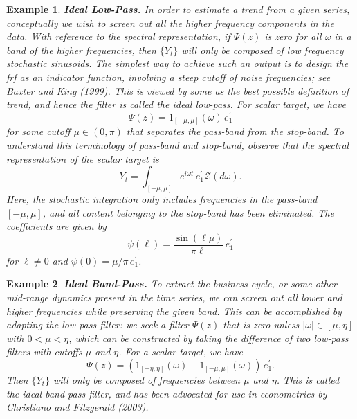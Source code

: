 \documentclass[a4paper]{book}
\newtheorem{Example}{Example}
\begin{document}
\begin{Example} {\bf Ideal Low-Pass.} \rm
\label{exam:ideal-low}
 In order to estimate a trend from a given series, conceptually we wish
 to screen out all the higher frequency components in the data.  With reference
 to the spectral representation, if $\Psi (z)$ is zero for all $\omega$ in a 
 band of the higher frequencies, then $\{ Y_t \}$ will only be composed of 
 low frequency stochastic sinusoids.  The simplest way to achieve such an output
 is to design the frf as an indicator function, involving 
  a steep cutoff of noise frequencies; see Baxter and King (1999).  This is
 viewed by some as the best possible definition of trend, and hence the filter is
 called the ideal low-pass.  For scalar target, we have
\[
  \Psi (z) = 1_{ [ -\mu, \mu ]} (\omega) \, e_1^{\prime}
\]
 for some cutoff $\mu \in (0, \pi)$ that separates the pass-band from
the stop-band.  To understand this terminology of pass-band and stop-band, observe
 that the spectral representation of the scalar target is
\[
  Y_t = \int_{ [-\mu, \mu]} e^{i \omega t} \, e_1^{\prime} 
  \mathcal{Z} (d\omega).
\]
  Here, the stochastic integration only includes frequencies in the pass-band 
 $[-\mu, \mu]$,  and all content belonging to the stop-band has been eliminated.
 The coefficients are given by 
\[ 
  \psi (\ell) = \frac{ \sin (\ell \mu) }{ \pi \ell } \, e_1^{\prime}
\]
 for $\ell \neq 0$ and $\psi (0) = \mu/\pi \, e_1^{\prime}$.   
\end{Example}

\begin{Example} {\bf Ideal Band-Pass.} \rm
\label{exam:ideal-bp}
  To extract  the business cycle, or
  some other mid-range dynamics present in the time series,
  we can screen out all lower and higher frequencies while preserving
   the given band.  This can be accomplished by adapting the
   low-pass filter: we seek a filter $\Psi (z)$  that is zero unless 
   $|\omega| \in  [\mu, \eta]$ with $0 < \mu < \eta$,
   which can be constructed by taking the difference of two low-pass
   filters with cutoffs $\mu$ and $\eta$.  For a scalar target, we have
  \[
  \Psi (z) = \left( 1_{ [ -\eta, \eta ]} (\omega) - 
    1_{ [ -\mu, \mu ]} (\omega) \right) \, e_1^{\prime}.
\]
Then $\{ Y_t \}$ will only be composed of frequencies 
between $\mu$ and $\eta$.  This is called the ideal band-pass filter,
 and has been advocated for use in econometrics by Christiano and Fitzgerald (2003).
\end{Example}
\end{document}
